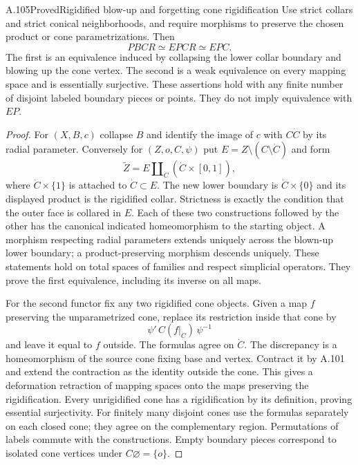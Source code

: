 \begin{saresult}{A.105}{Proved}{Rigidified blow-up and forgetting cone rigidification}
Use strict collars and strict conical neighborhoods, and require morphisms
to preserve the chosen product or cone parametrizations. Then
\[
 PBCR\simeq EPCR\simeq EPC.
\]
The first is an equivalence induced by collapsing the lower collar
boundary and blowing up the cone vertex. The second is a weak equivalence
on every mapping space and is essentially surjective. These assertions
hold with any finite number of disjoint labeled boundary pieces or points.
They do not imply equivalence with $EP$.
\end{saresult}
\begin{proof}
For $(X,B,c)$ collapse $B$ and identify the image of $c$ with
$C\dot C$ by its radial parameter. Conversely for $(Z,o,C,\psi)$ put
$E=Z\setminus(C\setminus\dot C)$ and form
\[
 \widetilde Z=E\amalg_{\dot C}(\dot C\times[0,1]),
\]
where $\dot C\times\{1\}$ is attached to $\dot C\subset E$.
The new lower boundary is $\dot C\times\{0\}$ and its displayed
product is the rigidified collar. Strictness is exactly the condition
that the outer face is collared in $E$. Each of these two constructions
followed by the other has the canonical indicated homeomorphism to the
starting object. A morphism respecting radial parameters extends
uniquely across the blown-up lower boundary; a product-preserving
morphism descends uniquely. These statements hold on total spaces of
families and respect simplicial operators. They prove the first
equivalence, including its inverse on all maps.

For the second functor fix any two rigidified cone objects. Given a map
$f$ preserving the unparametrized cone, replace its restriction inside
that cone by
\[
 \psi'\,C(f|_{\dot C})\,\psi^{-1}
\]
and leave it equal to $f$ outside. The formulas agree on $\dot C$.
The discrepancy is a homeomorphism of the source cone fixing base and
vertex. Contract it by A.101 and extend the contraction as the identity
outside the cone. This gives a deformation retraction of mapping spaces
onto the maps preserving the rigidification. Every unrigidified cone has
a rigidification by its definition, proving essential surjectivity.
For finitely many disjoint cones use the formulas separately on each
closed cone; they agree on the complementary region. Permutations of
labels commute with the constructions. Empty boundary pieces correspond
to isolated cone vertices under $C\varnothing=\{o\}$.
\end{proof}

